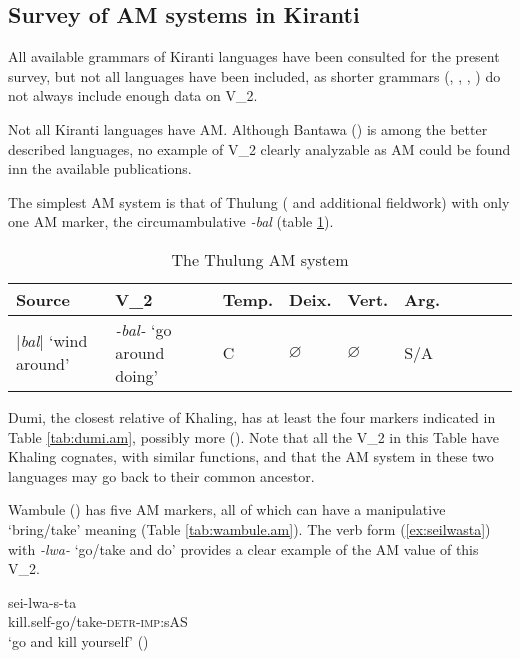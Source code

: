 \documentclass[oneside,a4paper,11pt]{article}
\newcommand{\ipa}[1]{{\phon\textit{#1}}}
\newcommand{\sens}[1]{‘#1’}
\newcommand{\dhatu}[2]{|\ipa{#1}| `#2'}
\begin{document}
\subsection{Survey of AM systems in Kiranti}
All available grammars of Kiranti languages have been consulted for the present survey, but not all languages have been included, as shorter grammars  (\citealt{ebert97athpare}, \citealt{ebert97camling}, \citealt{opgenort05jero}, \citealt{tolsma06kulung}) do not always include enough data on V_2. 

Not all Kiranti languages have AM. Although Bantawa (\citealt{doornenbal09}) is among the better described languages, no example of V_2 clearly analyzable as AM could be found inn the available publications.

The simplest AM system is that of Thulung (\citealt{lahaussois02thulung} and additional fieldwork) with only one AM marker, the circumambulative \ipa{-bal} (table \ref{tab:thulung.am}).

\begin{table}
\caption{The Thulung AM system} \label{tab:thulung.am} \centering
\begin{tabular}{llllllllll}
\toprule
Source &V_2 & Temp.& Deix. & Vert.& Arg. \\
\midrule
\dhatu{bal}{wind around} &	\ipa{-bal-} `go around doing' &	C &		$\varnothing$ &$\varnothing$&	S/A & \\
\bottomrule
\end{tabular}
\end{table}			

Dumi, the closest relative of Khaling, has at least the four markers indicated in Table \ref{tab:dumi.am}, possibly more (\citealt[199-214]{driem93dumi}). Note that all the V_2 in this Table have Khaling cognates, with similar functions, and that the AM system in these two languages may go back to their common ancestor.

Wambule (\citealt{opgenort04wambule}) has five AM markers, all of which can have a manipulative `bring/take' meaning (Table   \ref{tab:wambule.am}). The verb form (\ref{ex:seilwasta}) with  \ipa{-lwa-} `go/take and do' provides a clear example of the AM value of this V_2.
 
\begin{exe}
\ex \label{ex:seilwasta}
\gll sei-lwa-s-ta \\
kill.self-go/take-\textsc{detr}-\textsc{imp}:sAS   \\
\glt \sens{go and kill yourself} (\citealt[439]{opgenort04wambule}) 
\end{exe}
\end{document}
